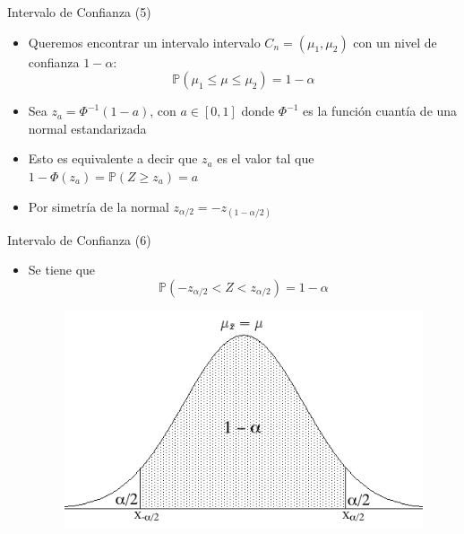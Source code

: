 \documentclass[handout]{beamer}
\begin{document}
\begin{frame}{Intervalo de Confianza (5)}
\scriptsize{
\begin{itemize}
 \item Queremos encontrar un intervalo intervalo $C_n = (\mu_1,\mu_2)$ con un nivel de confianza $1-\alpha$:
\begin{displaymath}
 \mathbb{P}(\mu_1 \leq \mu \leq \mu_2 ) = 1-\alpha
\end{displaymath}
\item Sea $z_a = \Phi^{-1}(1-a)$, con $a \in [0,1]$ donde $\Phi^{-1}$ es la función cuantía de una normal estandarizada
\item Esto es equivalente a decir que $z_a$ es el valor tal que $1-\Phi(z_a)=\mathbb{P}(Z \geq z_a)=a$

\item Por simetría de la normal $z_{\alpha/2}=-z_{(1-\alpha/2)}$
\end{itemize}


 }
\end{frame}



\begin{frame}{Intervalo de Confianza (6)}
\scriptsize{
\begin{itemize}
 \item Se tiene que \begin{displaymath}
\mathbb{P}(-z_{\alpha/2}<Z<z_{\alpha/2})=1-\alpha                     
                    \end{displaymath}

\begin{figure}[h!]
	\centering
	\includegraphics[scale=0.35]{pics/ConfIntervNormalP.png}
\end{figure}




\end{itemize}
}
 
\end{frame}
\end{document}
